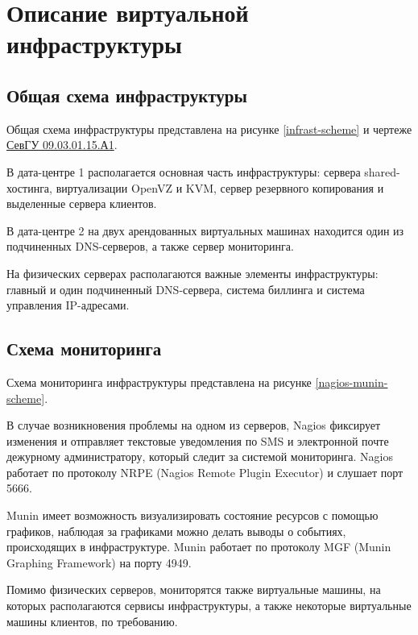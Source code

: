 \section{Описание виртуальной инфраструктуры}

\subsection{Общая схема инфраструктуры}

Общая схема инфраструктуры представлена на рисунке \ref{infrast-scheme} и чертеже \href{extra/drafts/SevGU_09.03.01.15.A1.pdf}{СевГУ 09.03.01.15.А1}.

В дата-центре 1 располагается основная часть инфраструктуры: сервера shared-хостинга, виртуализации OpenVZ и KVM, сервер резервного копирования и выделенные сервера клиентов.

В дата-центре 2 на двух арендованных виртуальных машинах находится один из подчиненных DNS-серверов, а также сервер мониторинга.

На физических серверах располагаются важные элементы инфраструктуры: главный и один подчиненный DNS-сервера, система биллинга и система управления IP-адресами.

\subsection{Схема мониторинга}

Схема мониторинга инфраструктуры представлена на рисунке \ref{nagios-munin-scheme}.

В случае возникновения проблемы на одном из серверов, Nagios фиксирует изменения и отправляет текстовые уведомления по SMS и электронной почте дежурному администратору, который следит за системой мониторинга.
Nagios работает по протоколу NRPE (Nagios Remote Plugin Executor) и слушает порт 5666.

Munin имеет возможность визуализировать состояние ресурсов с помощью графиков, наблюдая за графиками можно делать выводы о событиях, происходящих в инфраструктуре.
Munin работает по протоколу MGF (Munin Graphing Framework) на порту 4949.

Помимо физических серверов, мониторятся также виртуальные машины, на которых располагаются сервисы инфраструктуры, а также некоторые виртуальные машины клиентов, по требованию.

